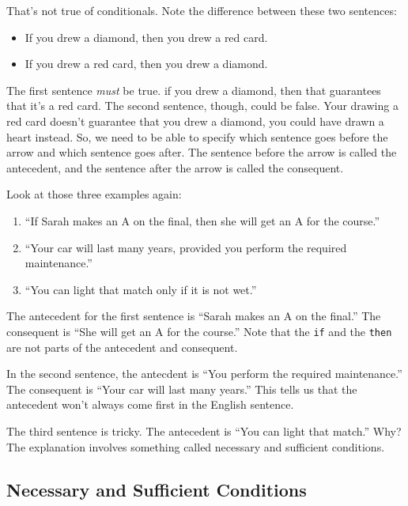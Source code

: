 That's not true of conditionals. Note the difference between these two sentences:

\begin{itemize}

\item
  If you drew a diamond, then you drew a red card.
\item
  If you drew a red card, then you drew a diamond.
\end{itemize}

The first sentence \emph{must} be true. if you drew a diamond, then that guarantees that it's a red card. The second sentence, though, could be false. Your drawing a red card doesn't guarantee that you drew a diamond, you could have drawn a heart instead. So, we need to be able to specify which sentence goes before the arrow and which sentence goes after. The sentence before the arrow is called the antecedent, and the sentence after the arrow is called the consequent.

Look at those three examples again:

\begin{enumerate}

\item
  ``If Sarah makes an A on the final, then she will get an A for the course.''
\item
  ``Your car will last many years, provided you perform the required maintenance.''
\item
  ``You can light that match only if it is not wet.''
\end{enumerate}

The antecedent for the first sentence is ``Sarah makes an A on the final.'' The consequent is ``She will get an A for the course.'' Note that the \texttt{if} and the \texttt{then} are not parts of the antecedent and consequent.

In the second sentence, the antecdent is ``You perform the required maintenance.'' The consequent is ``Your car will last many years.'' This tells us that the antecedent won't always come first in the English sentence.

The third sentence is tricky. The antecedent is ``You can light that match.'' Why? The explanation involves something called necessary and sufficient conditions.

\subsection{Necessary and Sufficient Conditions}\label{necessary-and-sufficient-conditions}

